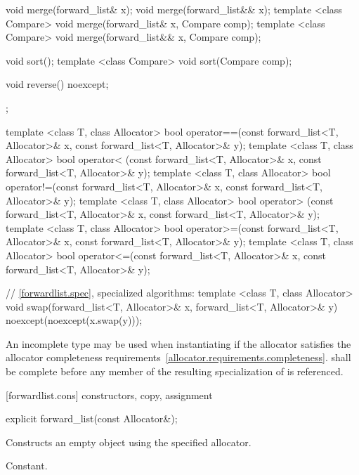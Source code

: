 \begin{codeblock}
{{    void merge(forward_list& x);
    void merge(forward_list&& x);
    template <class Compare> void merge(forward_list& x, Compare comp);
    template <class Compare> void merge(forward_list&& x, Compare comp);

    void sort();
    template <class Compare> void sort(Compare comp);

    void reverse() noexcept;
  };

  template <class T, class Allocator>
    bool operator==(const forward_list<T, Allocator>& x, const forward_list<T, Allocator>& y);
  template <class T, class Allocator>
    bool operator< (const forward_list<T, Allocator>& x, const forward_list<T, Allocator>& y);
  template <class T, class Allocator>
    bool operator!=(const forward_list<T, Allocator>& x, const forward_list<T, Allocator>& y);
  template <class T, class Allocator>
    bool operator> (const forward_list<T, Allocator>& x, const forward_list<T, Allocator>& y);
  template <class T, class Allocator>
    bool operator>=(const forward_list<T, Allocator>& x, const forward_list<T, Allocator>& y);
  template <class T, class Allocator>
    bool operator<=(const forward_list<T, Allocator>& x, const forward_list<T, Allocator>& y);

  // \ref{forwardlist.spec}, specialized algorithms:
  template <class T, class Allocator>
    void swap(forward_list<T, Allocator>& x, forward_list<T, Allocator>& y)
      noexcept(noexcept(x.swap(y)));
}
\end{codeblock}

\pnum
An incomplete type  may be used when instantiating 
if the allocator satisfies the
allocator completeness requirements~\ref{allocator.requirements.completeness}.
 shall be complete before any member of the resulting specialization
of  is referenced.

[forwardlist.cons]{ constructors, copy, assignment}

%
%
\begin{itemdecl}
explicit forward_list(const Allocator&);
\end{itemdecl}

\begin{itemdescr}
\pnum
\effects Constructs an empty  object using the specified allocator.

\pnum
\complexity Constant.
\end{itemdescr}

